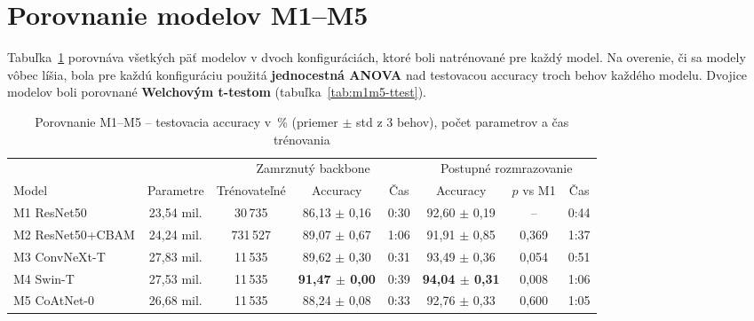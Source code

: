 \section{Porovnanie modelov M1--M5}
\label{sec:m1m5}

Tabuľka~\ref{tab:m1m5} porovnáva všetkých päť modelov v dvoch
konfiguráciách, ktoré boli natrénované pre každý model. Na overenie, či
sa modely vôbec líšia, bola pre každú konfiguráciu použitá
\textbf{jednocestná ANOVA} nad testovacou accuracy troch behov každého
modelu. Dvojice modelov boli porovnané \textbf{Welchovým t-testom}
(tabuľka~\ref{tab:m1m5-ttest}).

\begin{table}[H]
    \centering
    \caption{Porovnanie M1--M5 -- testovacia accuracy v~\% (priemer $\pm$ std z 3 behov), počet parametrov a čas trénovania}
    \label{tab:m1m5}
    \footnotesize
    \begin{tabular}{lccccccc}
        \toprule
         & & \multicolumn{3}{c}{Zamrznutý backbone} & \multicolumn{3}{c}{Postupné rozmrazovanie} \\
        \cmidrule(lr){3-5} \cmidrule(lr){6-8}
        Model & Parametre & Trénovateľné & Accuracy & Čas & Accuracy & $p$ vs M1 & Čas \\
        \midrule
        M1 ResNet50      & 23,54 mil. & 30\,735  & 86,13 $\pm$ 0,16 & 0:30 & 92,60 $\pm$ 0,19 & --    & 0:44 \\
        M2 ResNet50+CBAM & 24,24 mil. & 731\,527 & 89,07 $\pm$ 0,67 & 1:06 & 91,91 $\pm$ 0,85 & 0,369 & 1:37 \\
        M3 ConvNeXt-T    & 27,83 mil. & 11\,535  & 89,62 $\pm$ 0,30 & 0:31 & 93,49 $\pm$ 0,36 & 0,054 & 0:51 \\
        M4 Swin-T        & 27,53 mil. & 11\,535  & \textbf{91,47 $\pm$ 0,00} & 0:39 & \textbf{94,04 $\pm$ 0,31} & 0,008 & 1:06 \\
        M5 CoAtNet-0     & 26,68 mil. & 11\,535  & 88,24 $\pm$ 0,08 & 0:33 & 92,76 $\pm$ 0,33 & 0,600 & 1:05 \\
        \bottomrule
    \end{tabular}
\end{table}

